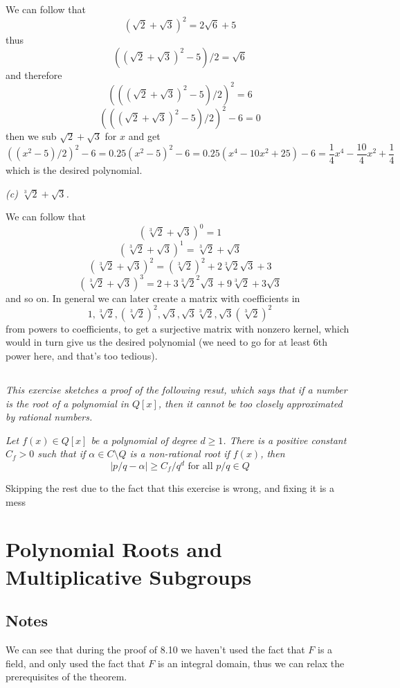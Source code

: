 \documentclass[11pt,oneside,titlepage]{book}
\begin{document}
We can follow that
$$(\sqrt{2} + \sqrt{3})^2 = 2\sqrt{6} + 5$$
thus
$$((\sqrt{2} + \sqrt{3})^2 - 5) / 2 = \sqrt{6}$$
and therefore
$$(((\sqrt{2} + \sqrt{3})^2 - 5) / 2)^2 = 6$$
$$(((\sqrt{2} + \sqrt{3})^2 - 5) / 2)^2 - 6 = 0$$
then we sub $\sqrt{2} + \sqrt{3}$ for $x$ and get
$$((x^2 - 5) / 2)^2 - 6 = 0.25 (x^2 - 5)^2 - 6 = 0.25 (x^4 - 10x^2 + 25)  - 6 =
\frac{1}{4}x^4 - \frac{10}{4}x^2 + \frac{1}{4}$$
which is the desired polynomial.

\textit{(c) $\sqrt[3]{2} + \sqrt{3}$.}

We can follow that
$$(\sqrt[3]{2} + \sqrt{3})^0 = 1$$
$$(\sqrt[3]{2} + \sqrt{3})^1 = \sqrt[3]{2} + \sqrt{3}$$
$$(\sqrt[3]{2} + \sqrt{3})^2 = (\sqrt[3]{2})^2 + 2\sqrt[3]{2}\sqrt{3} + 3$$
$$(\sqrt[3]{2} + \sqrt{3})^3 = 2 + 3 \sqrt[3]{2}^2 \sqrt{3} + 9 \sqrt[3]{2}  + 3\sqrt{3}$$
and so on. In general we can later create a matrix with coefficients
in
$$1, \sqrt[3]{2}, (\sqrt[3]{2})^2, \sqrt{3}, \sqrt{3}\sqrt[3]{2}, \sqrt{3}(\sqrt[3]{2})^2$$
from powers to coefficients, to get a surjective matrix with nonzero
kernel, which would in turn give us the desired polynomial (we need to go for at least
6th power here, and that's too tedious).

\subsection{}

\textit{This exercise sketches a proof of the following resut, which says that if a number is the root
  of a polynomial in $Q[x]$, then it cannot be too closely approximated by rational numbers.}

\textit{Let $f(x) \in Q[x]$ be a polynomial of degree $d \geq
1$. There is a positive constant $C_f > 0$ such that if $\alpha \in C
\setminus Q$ is a non-rational root if $f(x)$, then
$$|p/q - \alpha| \geq C_f/q^d \text{ for all }p/q \in Q$$}

Skipping the rest due to the fact that this exercise is wrong, and
fixing it is a mess

\section{Polynomial Roots and Multiplicative Subgroups}

\subsection*{Notes}

We can see that during the proof of 8.10 we haven't used the fact that
$F$ is a field, and only used the fact that $F$ is an integral domain,
thus we can relax the prerequisites of the theorem.
\end{document}
